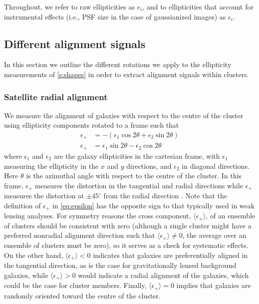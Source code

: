 Throughout, we refer to raw ellipticities as $e_i$, and to ellipticities that account for 
instrumental effects (i.e., PSF size in the case of gaussianized images) as $\epsilon_i$.


\subsection{Different alignment signals}

In this section we outline the different rotations we apply to the ellipticity measurements of 
\cref{s:shapes} in order to extract alignment signals within clusters.


\subsubsection{Satellite radial alignment}

We measure the alignment of galaxies with respect to the centre of the cluster using ellipticity 
components rotated to a frame such that
\begin{align}\label{eq:epsilon}
 \epsilon_+ &= -(\epsilon_1\cos 2\theta + \epsilon_2\sin 2\theta) \\
 \epsilon_\times &= \epsilon_1\sin 2\theta - \epsilon_2\cos 2\theta\,
\end{align}
where $\epsilon_1$ and $\epsilon_2$ are the galaxy ellipticities in the cartesian frame, with 
$\epsilon_1$ measuring the ellipticity in the $x$ and $y$ directions, and $\epsilon_2$ in diagonal 
directions. Here $\theta$ is the azimuthal angle with respect to the centre of the cluster. In 
this frame, $\epsilon_+$ measures the distortion in the tangential and radial directions while 
$\epsilon_\times$ measures the distortion at $\pm45^\circ$ from the radial direction \citep[see, 
e.g., Figure 1 of][for a diagram]{bernstein02}. Note that the definition of $\epsilon_+$ in 
\cref{eq:epsilon} has the opposite sign to that typically used in weak lensing analyses. For 
symmetry reasons the cross component, $\langle\epsilon_\times\rangle$, of an ensemble of clusters
should be consistent with zero (although a single cluster might have a preferred nonradial 
alignment direction such that $\langle\epsilon_\times\rangle\neq0$, the average over an ensemble of 
clusters must be zero), so it serves as a check for systematic effects. On the other hand, 
$\langle \epsilon_+\rangle<0$ indicates that galaxies are preferentially aligned in the tangential 
direction, as is the case for gravitationally lensed background galaxies, while 
$\langle\epsilon_+\rangle>0$ would indicate a radial alignment of the galaxies, which could be the 
case for cluster members. Finally, $\langle\epsilon_+\rangle=0$ implies that galaxies are 
randomly oriented toward the centre of the cluster.

